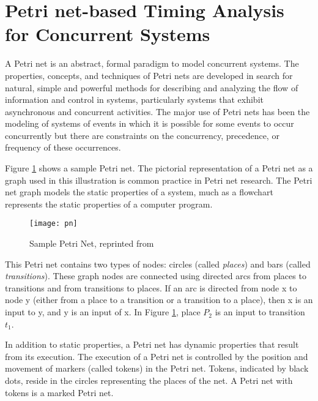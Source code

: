 
\section{Petri net-based Timing Analysis for Concurrent Systems}
\label{sec:petri_nets}

A Petri net \cite{peterson1977petri} is an abstract, formal paradigm to model
concurrent systems. The properties, concepts, and techniques of Petri nets are
developed in search for natural, simple and powerful methods for describing and
analyzing the flow of information and control in systems, particularly systems
that exhibit asynchronous and concurrent activities. The major use of Petri nets
has been the modeling of systems of events in which it is possible for some
events to occur concurrently but there are constraints on the concurrency,
precedence, or frequency of these occurrences.

Figure \ref{fig:pn} shows a sample Petri net. The pictorial representation of a
Petri net as a graph used in this illustration is common practice in Petri net
research. The Petri net graph models the static properties of a system, much as
a flowchart represents the static properties of a computer program.

\begin{figure}[ht]
 \centering
 \texttt{[image: pn]}
\caption{Sample Petri Net, reprinted from \cite{peterson1977petri}}
\label{fig:pn}
 \end{figure}

This Petri net contains two types of nodes: circles (called \emph{places}) and
bars (called \emph{transitions}). These graph nodes are connected using directed
arcs from places to transitions and from transitions to places. If an arc is
directed from node x to node y (either from a place to a transition or a
transition to a place), then x is an input to y, and y is an input of x. In
Figure \ref{fig:pn}, place $P_2$ is an input to transition $t_1$.

In addition to static properties, a Petri net has dynamic properties that result
from its execution. The execution of a Petri net is controlled by the position
and movement of markers (called tokens) in the Petri net. Tokens, indicated by
black dots, reside in the circles representing the places of the net. A Petri
net with tokens is a marked Petri net.

